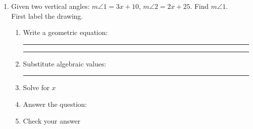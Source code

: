 \documentclass[12pt, oneside]{article}
\begin{document}
\begin{enumerate}
      \item Given two vertical angles: $m \angle 1 = 3x+10$, $m \angle 2 = 2x+25$. Find $m \angle 1$.\\
      First label the drawing.
      \begin{flushright}
      \end{flushright}
      \begin{enumerate}
        \item Write a geometric equation: \rule{4cm}{0.15mm} \hspace{1cm} \rule{4cm}{0.15mm}
        \vspace{.7cm}
        \item Substitute algebraic values: \rule{4cm}{0.15mm}
        \item Solve for $x$
        \vspace{2cm}
        \item Answer the question:
        \vspace{2cm}
        \item Check your answer
      \end{enumerate}

  \end{enumerate}

  \newpage
\end{document}
